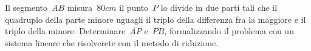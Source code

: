 \begin{esercizio}
 \label{ese:22.23}
Il segmento~\(AB\) misura~\(80\unit{cm}\) il punto~\(P\) lo divide in due parti tali 
che il quadruplo della parte minore uguagli il triplo della differenza fra 
la maggiore e il triplo della minore. 
Determinare~\(\overline{AP}\) e~\(\overline{PB}\), formalizzando
il problema con un sistema lineare che risolverete con il metodo di
riduzione.
\begin{center}
%  
\end{center}
\end{esercizio}

% 
% 
